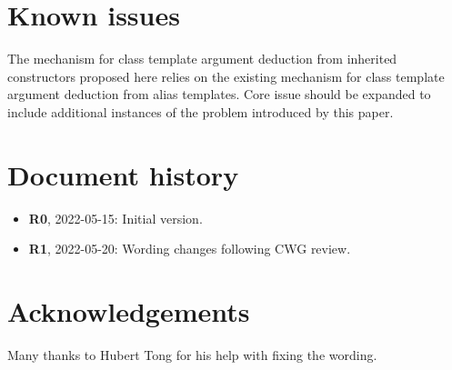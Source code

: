 
\section{Known issues}

The mechanism for class template argument deduction from inherited constructors proposed here relies on the existing mechanism for class template argument deduction from alias templates. Core issue \cite{CWG2467} should be expanded to include additional instances of the problem introduced by this paper.


\section*{Document history}

\begin{itemize}
\item \textbf{R0}, 2022-05-15: Initial version.
\item \textbf{R1}, 2022-05-20: Wording changes following CWG review.
\end{itemize}


\section*{Acknowledgements}

Many thanks to Hubert Tong for his help with fixing the wording.


\renewcommand{\bibname}{References}




